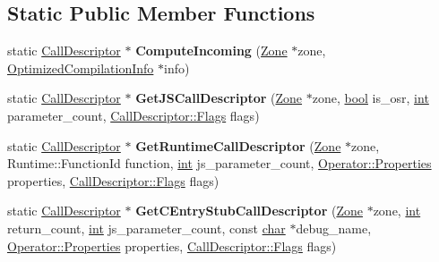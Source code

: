 \subsection*{Static Public Member Functions}
\begin{DoxyCompactItemize}
\item 
\mbox{\label{classv8_1_1internal_1_1compiler_1_1Linkage_ae1656adf5fd76105714bd2d8ab804391}} 
static \mbox{\hyperlink{classv8_1_1internal_1_1compiler_1_1CallDescriptor}{Call\+Descriptor}} $\ast$ {\bfseries Compute\+Incoming} (\mbox{\hyperlink{classv8_1_1internal_1_1Zone}{Zone}} $\ast$zone, \mbox{\hyperlink{classv8_1_1internal_1_1OptimizedCompilationInfo}{Optimized\+Compilation\+Info}} $\ast$info)
\item 
\mbox{\label{classv8_1_1internal_1_1compiler_1_1Linkage_a3bbe9435f778a029e61ffdf7c400ce95}} 
static \mbox{\hyperlink{classv8_1_1internal_1_1compiler_1_1CallDescriptor}{Call\+Descriptor}} $\ast$ {\bfseries Get\+J\+S\+Call\+Descriptor} (\mbox{\hyperlink{classv8_1_1internal_1_1Zone}{Zone}} $\ast$zone, \mbox{\hyperlink{classbool}{bool}} is\+\_\+osr, \mbox{\hyperlink{classint}{int}} parameter\+\_\+count, \mbox{\hyperlink{classv8_1_1base_1_1Flags}{Call\+Descriptor\+::\+Flags}} flags)
\item 
\mbox{\label{classv8_1_1internal_1_1compiler_1_1Linkage_adf658588edeb448d833571418d8d324b}} 
static \mbox{\hyperlink{classv8_1_1internal_1_1compiler_1_1CallDescriptor}{Call\+Descriptor}} $\ast$ {\bfseries Get\+Runtime\+Call\+Descriptor} (\mbox{\hyperlink{classv8_1_1internal_1_1Zone}{Zone}} $\ast$zone, Runtime\+::\+Function\+Id function, \mbox{\hyperlink{classint}{int}} js\+\_\+parameter\+\_\+count, \mbox{\hyperlink{classv8_1_1base_1_1Flags}{Operator\+::\+Properties}} properties, \mbox{\hyperlink{classv8_1_1base_1_1Flags}{Call\+Descriptor\+::\+Flags}} flags)
\item 
\mbox{\label{classv8_1_1internal_1_1compiler_1_1Linkage_ae00b41254a01b531a348f4ca43be2bfe}} 
static \mbox{\hyperlink{classv8_1_1internal_1_1compiler_1_1CallDescriptor}{Call\+Descriptor}} $\ast$ {\bfseries Get\+C\+Entry\+Stub\+Call\+Descriptor} (\mbox{\hyperlink{classv8_1_1internal_1_1Zone}{Zone}} $\ast$zone, \mbox{\hyperlink{classint}{int}} return\+\_\+count, \mbox{\hyperlink{classint}{int}} js\+\_\+parameter\+\_\+count, const \mbox{\hyperlink{classchar}{char}} $\ast$debug\+\_\+name, \mbox{\hyperlink{classv8_1_1base_1_1Flags}{Operator\+::\+Properties}} properties, \mbox{\hyperlink{classv8_1_1base_1_1Flags}{Call\+Descriptor\+::\+Flags}} flags)

\end{DoxyCompactItemize}
